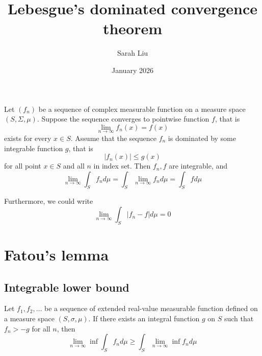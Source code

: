 \documentclass{article}
\title{Lebesgue's dominated convergence theorem}
\author{Sarah Liu}
\date{January 2026}
\theoremstyle{plain}
\theoremstyle{remark}
\begin{document}
\maketitle

Let $(f_n)$ be a sequence of complex measurable function on a measure space $(S, \Sigma, \mu)$. 
Suppose the sequence converges to pointwise function $f$, that is 
\[
\lim_{n\rightarrow \infty}f_n(x)=f(x)
\]
exists for every $x\in S$.
Assume that the sequence $f_n$ is dominated by some integrable function $g$, that is 
\[
|f_n(x)|\leq g(x)
\]
for all point $x \in S$ and all $n$ in index set. 
Then $f_n,f$ are integrable, and
\[
\lim_{n \rightarrow \infty}\int_{S}f_n d\mu = \int_{S}\lim_{n \rightarrow \infty}f_n d\mu = \int_{S}f d\mu
\]

Furthermore, we could write
\[
\lim_{n \rightarrow \infty}\int_{S}|f_n-f| d\mu = 0
\]

\section{Fatou's lemma}
\subsection{Integrable lower bound}
Let $f_1,f_2,\dots$ be a sequence of extended real-value measurable function defined on a measure space $(S, \sigma, \mu)$. If there exists an integral function $g$ on $S$ such that $f_n>-g$ for all $n$, then
\[
\lim_{n \rightarrow \infty}\inf\int_{S}f_n d\mu \geq \int_{S}\lim_{n \rightarrow \infty}\inf f_n d\mu
\]
\end{document}
